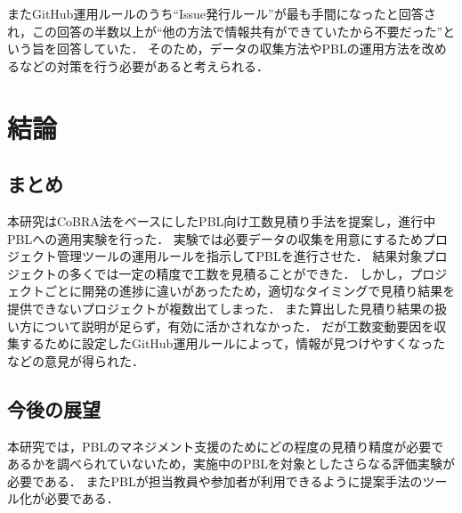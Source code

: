 \documentclass{compsoft}
\begin{document}
またGitHub運用ルールのうち``Issue発行ルール''が最も手間になったと回答され，この回答の半数以上が``他の方法で情報共有ができていたから不要だった''という旨を回答していた．
そのため，データの収集方法やPBLの運用方法を改めるなどの対策を行う必要があると考えられる．

\section{結論} \label{conclusion}
\subsection{まとめ} \label{summary}
本研究はCoBRA法をベースにしたPBL向け工数見積り手法を提案し，進行中PBLへの適用実験を行った．
実験では必要データの収集を用意にするためプロジェクト管理ツールの運用ルールを指示してPBLを進行させた．
結果対象プロジェクトの多くでは一定の精度で工数を見積ることができた．
しかし，プロジェクトごとに開発の進捗に違いがあったため，適切なタイミングで見積り結果を提供できないプロジェクトが複数出てしまった．
また算出した見積り結果の扱い方について説明が足らず，有効に活かされなかった．
だが工数変動要因を収集するために設定したGitHub運用ルールによって，情報が見つけやすくなったなどの意見が得られた．

\subsection{今後の展望} \label{future-view}
本研究では，PBLのマネジメント支援のためにどの程度の見積り精度が必要であるかを調べられていないため，実施中のPBLを対象としたさらなる評価実験が必要である．
またPBLが担当教員や参加者が利用できるように提案手法のツール化が必要である．
\end{document}
